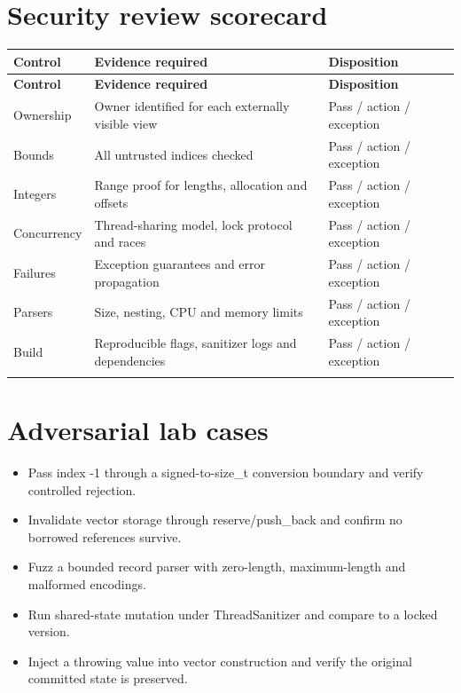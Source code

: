 \documentclass[11pt]{article}
\begin{document}
\section{Security review scorecard}
\small
\begin{longtable}{@{}>{\raggedright\arraybackslash}p{.22\linewidth}>{\raggedright\arraybackslash}p{.34\linewidth}>{\raggedright\arraybackslash}p{}@{}}
\toprule
\textbf{Control} & \textbf{Evidence required} & \textbf{Disposition}\\
\midrule
\endfirsthead
\toprule
\textbf{Control} & \textbf{Evidence required} & \textbf{Disposition}\\
\midrule
\endhead
Ownership & Owner identified for each externally visible view & Pass / action / exception\\
\addlinespace[2pt]
Bounds & All untrusted indices checked & Pass / action / exception\\
\addlinespace[2pt]
Integers & Range proof for lengths, allocation and offsets & Pass / action / exception\\
\addlinespace[2pt]
Concurrency & Thread-sharing model, lock protocol and races & Pass / action / exception\\
\addlinespace[2pt]
Failures & Exception guarantees and error propagation & Pass / action / exception\\
\addlinespace[2pt]
Parsers & Size, nesting, CPU and memory limits & Pass / action / exception\\
\addlinespace[2pt]
Build & Reproducible flags, sanitizer logs and dependencies & Pass / action / exception\\
\addlinespace[2pt]
\bottomrule
\end{longtable}
\normalsize
\section{Adversarial lab cases}
\begin{itemize}[leftmargin=*,itemsep=1pt,topsep=3pt]
\item Pass index -1 through a signed-to-size\_t conversion boundary and verify controlled rejection.
\item Invalidate vector storage through reserve/push\_back and confirm no borrowed references survive.
\item Fuzz a bounded record parser with zero-length, maximum-length and malformed encodings.
\item Run shared-state mutation under ThreadSanitizer and compare to a locked version.
\item Inject a throwing value into vector construction and verify the original committed state is preserved.
\end{itemize}
\docend
\end{document}
